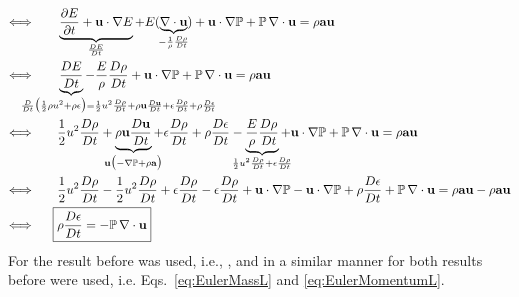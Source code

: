 \begin{itemize}
\begin{align*}
  \Longleftrightarrow\qquad
  &\underbrace{ \frac{\partial E}{\partial t} + \textbf{u}\cdot\nabla E }_{\mathclap{\frac{DE}{Dt}}} + E(\underbrace{ \nabla\cdot\textbf{u} }_{\mathclap{-\frac{1}{\rho} \frac{D\rho}{Dt}}}) + \textbf{u}\cdot\nabla\mathbb{P} + \mathbb{P}\,\nabla\cdot\textbf{u} = \rho\textbf{a}\textbf{u} \\
  \Longleftrightarrow\qquad
  &\underbrace{ \frac{DE}{Dt} }_{\mathclap{\hspace{75pt}\frac{D}{Dt}\big(\frac{1}{2}\rho u^{2} + \rho\epsilon\big) = \frac{1}{2}u^{2}\frac{D\rho}{Dt} + \rho\textbf{u}\frac{D\textbf{u}}{Dt} + \epsilon\frac{D\rho}{Dt} + \rho\frac{D\epsilon}{Dt} }} - \frac{E}{\rho} \frac{D\rho}{Dt} + \textbf{u}\cdot\nabla\mathbb{P} + \mathbb{P}\,\nabla\cdot\textbf{u} = \rho\textbf{a}\textbf{u} \\
  \Longleftrightarrow\qquad
  &\frac{1}{2}u^{2}\frac{D\rho}{Dt} + \underbrace{ \rho\textbf{u}\frac{D\textbf{u}}{Dt} }_{\mathclap{\textbf{u}\big(-\nabla\mathbb{P} + \rho\textbf{a}\big)}} + \epsilon\frac{D\rho}{Dt} + \rho\frac{D\epsilon}{Dt} - \underbrace{ \frac{E}{\rho} \frac{D\rho}{Dt} }_{\mathclap{\frac{1}{2}u^{2}\frac{D\rho}{Dt} + \epsilon\frac{D\rho}{Dt}}} + \textbf{u}\cdot\nabla\mathbb{P} + \mathbb{P}\,\nabla\cdot\textbf{u} = \rho\textbf{a}\textbf{u} \\
  \Longleftrightarrow\qquad
  &\frac{1}{2}u^{2}\frac{D\rho}{Dt} - \frac{1}{2}u^{2}\frac{D\rho}{Dt} + \epsilon\frac{D\rho}{Dt} - \epsilon\frac{D\rho}{Dt} + \textbf{u}\cdot\nabla\mathbb{P} - \textbf{u}\cdot\nabla\mathbb{P} + \rho\frac{D\epsilon}{Dt} + \mathbb{P}\,\nabla\cdot\textbf{u} = \rho\textbf{a}\textbf{u} - \rho\textbf{a}\textbf{u} \\
  \Longleftrightarrow\qquad\!\!
  \Aboxed{&\rho\frac{D\epsilon}{Dt} = - \mathbb{P}\,\nabla\cdot\textbf{u}}
 \end{align*}
 For  the result before was used, i.e., , and in a similar manner for  both results before were used, i.e. Eqs.~\eqref{eq:EulerMassL} and \eqref{eq:EulerMomentumL}.

\end{itemize}
